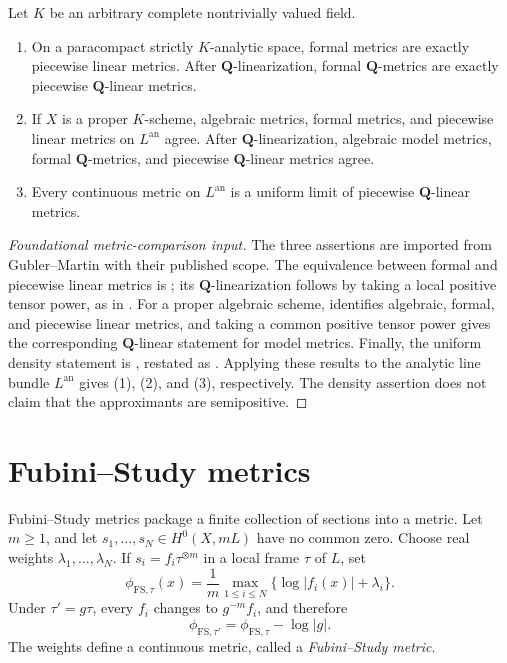 \begin{theorem}
\label{thm:gm-metric-comparison}
Let $K$ be an arbitrary complete nontrivially valued field.
\begin{enumerate}
\item On a paracompact strictly $K$-analytic space, formal metrics are
exactly piecewise linear metrics. After $\mathbf Q$-linearization, formal
$\mathbf Q$-metrics are exactly piecewise $\mathbf Q$-linear metrics.
\item If $X$ is a proper $K$-scheme, algebraic metrics, formal metrics,
and piecewise linear metrics on $L^{\mathrm{an}}$ agree. After
$\mathbf Q$-linearization, algebraic model metrics, formal
$\mathbf Q$-metrics, and piecewise $\mathbf Q$-linear metrics agree.
\item Every continuous metric on $L^{\mathrm{an}}$ is a uniform limit of
piecewise $\mathbf Q$-linear metrics.
\end{enumerate}
\end{theorem}
\begin{proof}[Foundational metric-comparison input]
The three assertions are imported from Gubler--Martin with their published
scope. The equivalence between formal and piecewise linear metrics is
\cite[Proposition~2.10]{GM19}; its $\mathbf Q$-linearization follows by
taking a local positive tensor power, as in
\cite[Definition~2.11]{GM19}. For a proper algebraic scheme,
\cite[Theorem~1.1]{GM19} identifies algebraic, formal, and piecewise linear
metrics, and taking a common positive tensor power gives the corresponding
$\mathbf Q$-linear statement for model metrics. Finally, the uniform density
statement is \cite[Theorem~1.2 and Proposition~2.15]{GM19}, restated as
\cite[Theorem~2.17]{GM19}. Applying these results to the analytic line
bundle $L^{\mathrm{an}}$ gives (1), (2), and (3), respectively. The
density assertion does not claim that the approximants are semipositive.
\end{proof}

\section{Fubini--Study metrics}
\label{sec:metrics-fs}

Fubini--Study metrics package a finite collection of sections into a metric.
Let $m\geq1$, and let $s_1,\ldots,s_N\in H^0(X,mL)$ have no common zero.
Choose real weights $\lambda_1,\ldots,\lambda_N$. If
$s_i=f_i\tau^{\otimes m}$ in a local frame $\tau$ of $L$, set
\[
 \phi_{\mathrm{FS},\tau}(x)
     =\frac1m\max_{1\leq i\leq N}
                    \{\log|f_i(x)|+\lambda_i\}.
\]
Under $\tau'=g\tau$, every $f_i$ changes to $g^{-m}f_i$, and therefore
\[
                 \phi_{\mathrm{FS},\tau'}
                 =\phi_{\mathrm{FS},\tau}-\log|g|.
\]
The weights define a continuous metric, called a
\emph{Fubini--Study metric}.


